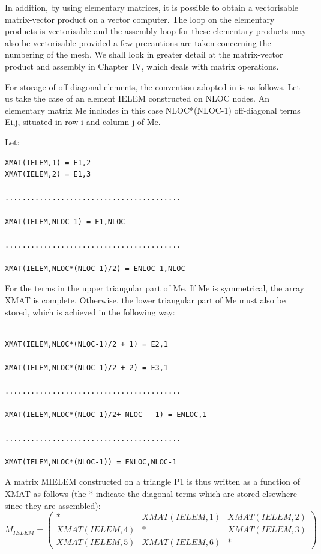 In addition, by using elementary matrices, it is possible to obtain a
vectorisable matrix-vector product on a vector computer. The loop on the
elementary products is vectorisable and the assembly loop for these elementary
products may also be vectorisable provided a few precautions are taken
concerning the numbering of the mesh. We shall look in greater detail at the
matrix-vector product and assembly in Chapter~IV, which deals with matrix
operations.

For storage of off-diagonal elements, the convention adopted in \bief is as
follows. Let us take the case of an element IELEM constructed on NLOC nodes. An
elementary matrix Me includes in this case NLOC*(NLOC-1) off-diagonal terms
Ei,j, situated in row i and column j of Me.

Let:
\begin{lstlisting}[language=TelFortran]
XMAT(IELEM,1) = E1,2
XMAT(IELEM,2) = E1,3

.........................................

XMAT(IELEM,NLOC-1) = E1,NLOC

.........................................

XMAT(IELEM,NLOC*(NLOC-1)/2) = ENLOC-1,NLOC
\end{lstlisting}

For the terms in the upper triangular part of Me. If Me is symmetrical, the
array XMAT is complete. Otherwise, the lower triangular part of Me must also be
stored, which is achieved in the following way:
\begin{lstlisting}[language=TelFortran]

XMAT(IELEM,NLOC*(NLOC-1)/2 + 1) = E2,1

XMAT(IELEM,NLOC*(NLOC-1)/2 + 2) = E3,1

.........................................

XMAT(IELEM,NLOC*(NLOC-1)/2+ NLOC - 1) = ENLOC,1

.........................................

XMAT(IELEM,NLOC*(NLOC-1)) = ENLOC,NLOC-1
\end{lstlisting}

A matrix MIELEM constructed on a triangle P1 is thus written as a function of
XMAT as follows (the * indicate the diagonal terms which are stored elsewhere
since they are assembled):
$M_{IELEM}=
\left(
\begin{array}{ccc}
        *       & XMAT(IELEM,1) & XMAT(IELEM,2) \\
  XMAT(IELEM,4) &       *       & XMAT(IELEM,3) \\
  XMAT(IELEM,5) & XMAT(IELEM,6) &       *
\end{array}
 \right)$

